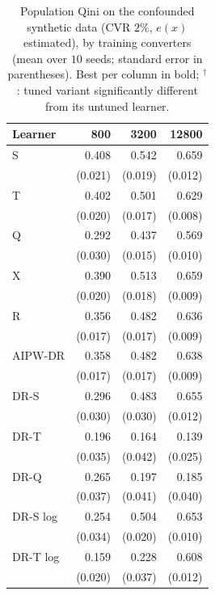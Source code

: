 \documentclass{article}
\begin{document}
\begin{table}[H]
\centering
\caption{Population Qini on the confounded synthetic data (CVR $2\%$, $e(x)$
estimated), by training converters (mean over $10$ seeds; standard error in
parentheses). Best per column in bold; $^\dagger$: tuned variant
significantly different from its untuned learner.}
\label{tab:app-synthconf-qini}
\footnotesize
\setlength{\tabcolsep}{3pt}
\begin{tabular}{l|rrr}
\hline
Learner & 800 & 3200 & 12800 \\
\hline
S & 0.408 & 0.542 & 0.659 \\
 & \scriptsize (0.021) & \scriptsize (0.019) & \scriptsize (0.012) \\[2pt]
T & 0.402 & 0.501 & 0.629 \\
 & \scriptsize (0.020) & \scriptsize (0.017) & \scriptsize (0.008) \\[2pt]
\hline
Q & 0.292 & 0.437 & 0.569 \\
 & \scriptsize (0.030) & \scriptsize (0.015) & \scriptsize (0.010) \\[2pt]
\hline
X & 0.390 & 0.513 & 0.659 \\
 & \scriptsize (0.020) & \scriptsize (0.018) & \scriptsize (0.009) \\[2pt]
R & 0.356 & 0.482 & 0.636 \\
 & \scriptsize (0.017) & \scriptsize (0.017) & \scriptsize (0.009) \\[2pt]
AIPW-DR & 0.358 & 0.482 & 0.638 \\
 & \scriptsize (0.017) & \scriptsize (0.017) & \scriptsize (0.009) \\[2pt]
\hline
DR-S & 0.296 & 0.483 & 0.655 \\
 & \scriptsize (0.030) & \scriptsize (0.030) & \scriptsize (0.012) \\[2pt]
DR-T & 0.196 & 0.164 & 0.139 \\
 & \scriptsize (0.035) & \scriptsize (0.042) & \scriptsize (0.025) \\[2pt]
DR-Q & 0.265 & 0.197 & 0.185 \\
 & \scriptsize (0.037) & \scriptsize (0.041) & \scriptsize (0.040) \\[2pt]
\hline
DR-S log & 0.254 & 0.504 & 0.653 \\
 & \scriptsize (0.034) & \scriptsize (0.020) & \scriptsize (0.010) \\[2pt]
DR-T log & 0.159 & 0.228 & 0.608 \\
 & \scriptsize (0.020) & \scriptsize (0.037) & \scriptsize (0.012) \\[2pt]

\end{tabular}
\end{table}
\end{document}
